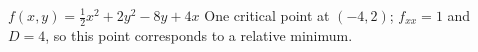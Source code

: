 {$f(x,y) = \frac12x^2+2y^2-8y+4x$
}
{
One critical point at $(-4,2)$; $f_{xx} = 1$ and $D = 4$, so this point corresponds to a relative minimum.
}